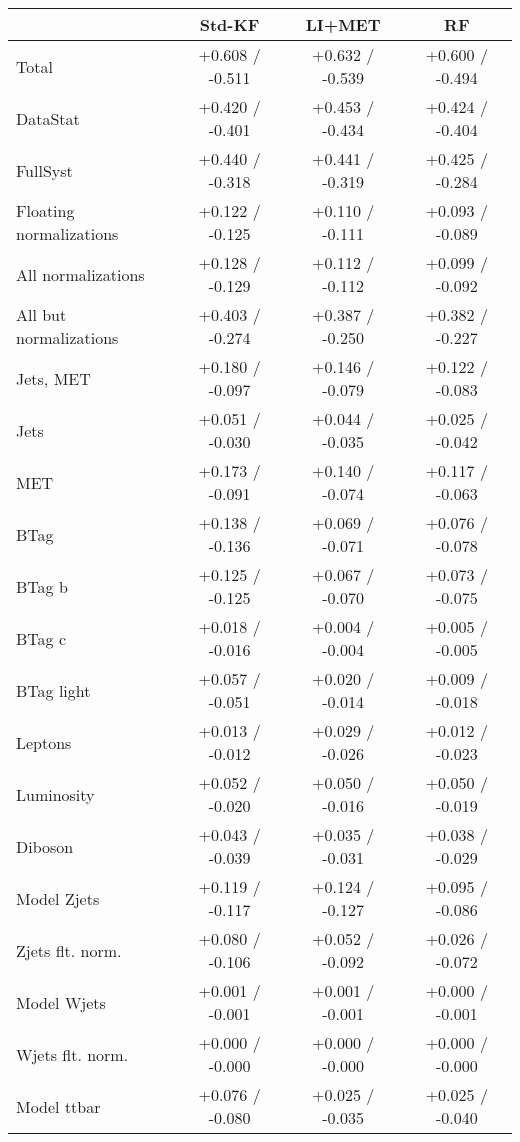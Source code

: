 \begin{table}[!htbp]
\begin{center}
\begin{tabular}{lccc}
\hline\hline
 &Std-KF &LI+MET &RF\\
\hline
Total &  +0.608 / -0.511  &  +0.632 / -0.539  &  +0.600 / -0.494 \\
DataStat &  +0.420 / -0.401  &  +0.453 / -0.434  &  +0.424 / -0.404 \\
FullSyst &  +0.440 / -0.318  &  +0.441 / -0.319  &  +0.425 / -0.284 \\
Floating normalizations &  +0.122 / -0.125  &  +0.110 / -0.111  &  +0.093 / -0.089 \\
All normalizations &  +0.128 / -0.129  &  +0.112 / -0.112  &  +0.099 / -0.092 \\
All but normalizations &  +0.403 / -0.274  &  +0.387 / -0.250  &  +0.382 / -0.227 \\
\hline
Jets, MET &  +0.180 / -0.097  &  +0.146 / -0.079  &  +0.122 / -0.083 \\
Jets &  +0.051 / -0.030  &  +0.044 / -0.035  &  +0.025 / -0.042 \\
MET &  +0.173 / -0.091  &  +0.140 / -0.074  &  +0.117 / -0.063 \\
BTag &  +0.138 / -0.136  &  +0.069 / -0.071  &  +0.076 / -0.078 \\
BTag b &  +0.125 / -0.125  &  +0.067 / -0.070  &  +0.073 / -0.075 \\
BTag c &  +0.018 / -0.016  &  +0.004 / -0.004  &  +0.005 / -0.005 \\
BTag light &  +0.057 / -0.051  &  +0.020 / -0.014  &  +0.009 / -0.018 \\
Leptons &  +0.013 / -0.012  &  +0.029 / -0.026  &  +0.012 / -0.023 \\
Luminosity &  +0.052 / -0.020  &  +0.050 / -0.016  &  +0.050 / -0.019 \\
Diboson &  +0.043 / -0.039  &  +0.035 / -0.031  &  +0.038 / -0.029 \\
Model Zjets &  +0.119 / -0.117  &  +0.124 / -0.127  &  +0.095 / -0.086 \\
Zjets flt. norm. &  +0.080 / -0.106  &  +0.052 / -0.092  &  +0.026 / -0.072 \\
Model Wjets &  +0.001 / -0.001  &  +0.001 / -0.001  &  +0.000 / -0.001 \\
Wjets flt. norm. &  +0.000 / -0.000  &  +0.000 / -0.000  &  +0.000 / -0.000 \\
Model ttbar &  +0.076 / -0.080  &  +0.025 / -0.035  &  +0.025 / -0.040 \\

\end{tabular}
\end{center}
\end{table}
